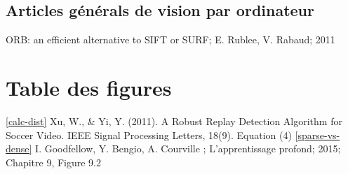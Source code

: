 \documentclass[11pt]{article}
\begin{document}
\subsection{Articles générals de vision par ordinateur}
\label{sec:org03a4bbb}
ORB: an efficient alternative to SIFT or SURF; E. Rublee, V. Rabaud; 2011

\section{Table des figures}
\label{sec:org6441457}
\ref{calc-dist} Xu, W., \& Yi, Y. (2011). A Robust Replay Detection Algorithm for Soccer Video. IEEE Signal Processing Letters, 18(9). Equation (4)
\ref{sparse-vs-dense} I. Goodfellow, Y. Bengio, A. Courville ; L'apprentissage profond; 2015; Chapitre 9, Figure 9.2



\end{document}
